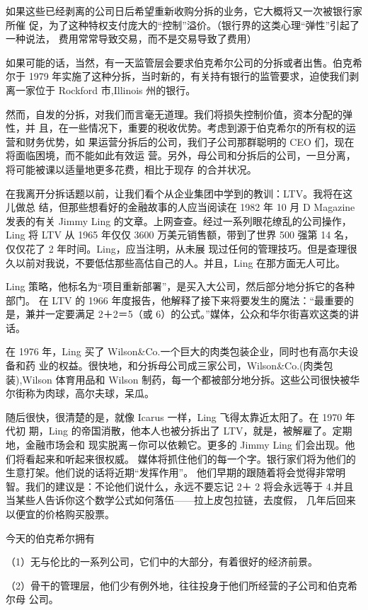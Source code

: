 \documentclass[UTF8,a4paper,zihao=-4,fontset = windows]{ctexart} %
\begin{document}
如果这些已经剥离的公司日后希望重新收购分拆的业务，它大概将又一次被银行家所催
促，为了这种特权支付庞大的“控制”溢价。（银行界的这类心理“弹性”引起了一种说法，
费用常常导致交易，而不是交易导致了费用）

如果可能的话，当然，有一天监管层会要求伯克希尔公司的分拆或者出售。伯克希尔于
1979 年实施了这种分拆，当时新的，有关持有银行的监管要求，迫使我们剥离一家位于
Rockford 市,Illinois 州的银行。

然而，自发的分拆，对我们而言毫无道理。我们将损失控制价值，资本分配的弹性，并
且，在一些情况下，重要的税收优势。考虑到源于伯克希尔的所有权的运营和财务优势，如
果运营分拆后的公司，我们子公司那群聪明的 CEO 们，现在将面临困境，而不能如此有效运
营。另外，母公司和分拆后的公司，一旦分离，将可能被课以适量地更多花费，相比于现存
的合并状况。

在我离开分拆话题以前，让我们看个从企业集团中学到的教训：LTV。我将在这儿做总
结，但那些想看好的金融故事的人应当阅读在 1982 年 10 月 D Magazine 发表的有关 Jimmy
Ling 的文章。上网查查。经过一系列眼花缭乱的公司操作，Ling 将 LTV 从 1965 年仅仅 3600
万美元销售额，带到了世界 500 强第 14 名，仅仅花了 2 年时间。Ling，应当注明，从未展
现过任何的管理技巧。但是查理很久以前对我说，不要低估那些高估自己的人。并且，Ling
在那方面无人可比。

Ling 策略，他标名为“项目重新部署”，是买入大公司，然后部分地分拆它的各种部门。
在 LTV 的 1966 年度报告，他解释了接下来将要发生的魔法：“最重要的是，兼并一定要满足
2＋2＝5（或 6）的公式。”媒体，公众和华尔街喜欢这类的讲话。

在 1976 年，Ling 买了 Wilson\&Co.一个巨大的肉类包装企业，同时也有高尔夫设备和药
业的权益。很快地，和分拆母公司成三家公司，Wilson\&Co.(肉类包装),Wilson 体育用品和
Wilson 制药，每一个都被部分地分拆。这些公司很快被华尔街称为肉球，高尔夫球，呆瓜。

随后很快，很清楚的是，就像 Icarus 一样，Ling 飞得太靠近太阳了。在 1970 年代初
期，Ling 的帝国消散，他本人也被分拆出了 LTV，就是，被解雇了。定期地，金融市场会和
现实脱离－你可以依赖它。更多的 Jimmy Ling 们会出现。他们将看起来和听起来很权威。
媒体将抓住他们的每一个字。银行家们将为他们的生意打架。他们说的话将近期“发挥作用”。
他们早期的跟随着将会觉得非常明智。我们的建议是：不论他们说什么，永远不要忘记 2＋
2 将会永远等于 4.并且当某些人告诉你这个数学公式如何落伍——拉上皮包拉链，去度假，
几年后回来以便宜的价格购买股票。

今天的伯克希尔拥有

（1）无与伦比的一系列公司，它们中的大部分，有着很好的经济前景。

（2）骨干的管理层，他们少有例外地，往往投身于他们所经营的子公司和伯克希尔母
公司。
\end{document}
